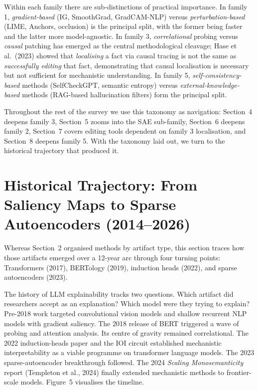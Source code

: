 \documentclass{article}
\begin{document}
Within each family there are sub-distinctions of practical importance. In family 1, \emph{gradient-based} (IG, SmoothGrad, GradCAM-NLP) versus \emph{perturbation-based} (LIME, Anchors, occlusion) is the principal split, with the former being faster and the latter more model-agnostic. In family 3, \emph{correlational} probing versus \emph{causal} patching has emerged as the central methodological cleavage; Hase et al.~(2023) showed that \emph{localising} a fact via causal tracing is not the same as \emph{successfully editing} that fact, demonstrating that causal localisation is necessary but not sufficient for mechanistic understanding. In family 5, \emph{self-consistency-based} methods (SelfCheckGPT, semantic entropy) versus \emph{external-knowledge-based} methods (RAG-based hallucination filters) form the principal split.

Throughout the rest of the survey we use this taxonomy as navigation: Section~4 deepens family 3, Section~5 zooms into the SAE sub-family, Section~6 deepens family 2, Section~7 covers editing tools dependent on family 3 localisation, and Section~8 deepens family 5. With the taxonomy laid out, we turn to the historical trajectory that produced it.

\section{Historical Trajectory: From Saliency Maps to Sparse Autoencoders (2014--2026)}\label{historical-trajectory-from-saliency-maps-to-sparse-autoencoders-20142026}

Whereas Section~2 organised methods by artifact type, this section traces how those artifacts emerged over a 12-year arc through four turning points: Transformers (2017), BERTology (2019), induction heads (2022), and sparse autoencoders (2023).

The history of LLM explainability tracks two questions. Which artifact did researchers accept as an explanation? Which model were they trying to explain? Pre-2018 work targeted convolutional vision models and shallow recurrent NLP models with gradient saliency. The 2018 release of BERT triggered a wave of probing and attention analysis. Its centre of gravity remained correlational. The 2022 induction-heads paper \citep{olsson2022incontextlearninga} and the IOI circuit \citep{wang2022interpretabilityin} established mechanistic interpretability as a viable programme on transformer language models. The 2023 sparse-autoencoder breakthrough \citep{cunningham2023sparseautoencoders} followed. The 2024 \emph{Scaling Monosemanticity} report (Templeton et al., 2024) finally extended mechanistic methods to frontier-scale models. Figure~5 visualises the timeline.
\end{document}
